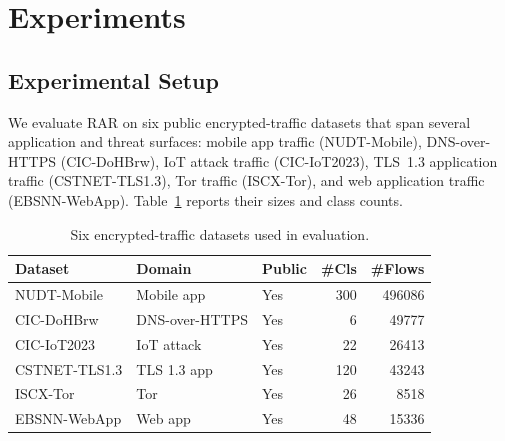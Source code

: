 %

\section{Experiments}\label{sec:eval}

\subsection{Experimental Setup}

We evaluate RAR on six public encrypted-traffic datasets that span several application and threat surfaces: mobile app traffic (NUDT-Mobile), DNS-over-HTTPS (CIC-DoHBrw), IoT attack traffic (CIC-IoT2023), TLS~1.3 application traffic (CSTNET-TLS1.3), Tor traffic (ISCX-Tor), and web application traffic (EBSNN-WebApp). Table~\ref{tab:datasets} reports their sizes and class counts.

\begin{table}[t]
\caption{Six encrypted-traffic datasets used in evaluation.}
\label{tab:datasets}
\centering
\footnotesize
\begin{tabular}{p{2.4cm}llrr}
\toprule
Dataset & Domain & Public & \#Cls & \#Flows \\
\midrule
NUDT-Mobile      & Mobile app     & Yes & 300 & 496086 \\
CIC-DoHBrw       & DNS-over-HTTPS & Yes & 6 & 49777 \\
CIC-IoT2023      & IoT attack     & Yes & 22 & 26413 \\
CSTNET-TLS1.3    & TLS 1.3 app    & Yes & 120 & 43243 \\
ISCX-Tor         & Tor            & Yes & 26 & 8518 \\
EBSNN-WebApp     & Web app        & Yes & 48 & 15336 \\
\bottomrule
\end{tabular}
\end{table}

